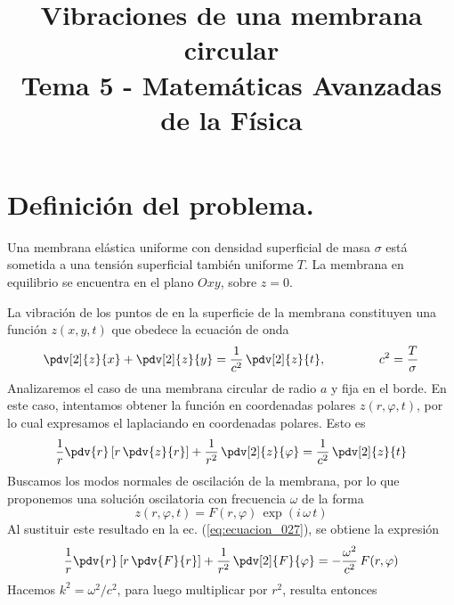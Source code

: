 
\title{Vibraciones de una membrana circular \\ {\large Tema 5 - Matemáticas Avanzadas de la Física}\vspace{-1.5\baselineskip}}
\date{ }
\author{}

\maketitle
\fontsize{14}{14}\selectfont
\section{Definición del problema.}
Una membrana elástica uniforme con densidad superficial de masa $\sigma$ está sometida a
una tensión superficial también uniforme $T$. La membrana en equilibrio se encuentra en
el plano $Oxy$, sobre $z = 0$.
\par
La vibración de los puntos de en la superficie de la membrana constituyen una función $z(x, y, t)$ que obedece la ecuación de onda
\begin{equation}
\pdv[2]{z}{x} + \pdv[2]{z}{y} = \dfrac{1}{c^{2}} \, \pdv[2]{z}{t}, \hspace{1.5cm} c^{2} = \dfrac{T}{\sigma}
\label{eq:ecuacion_026}
\end{equation}
Analizaremos el caso de una membrana circular de radio $a$ y fija en el borde. En este
caso, intentamos obtener la función en coordenadas polares $z (r , \varphi, t)$, por lo cual expresamos el laplaciando en coordenadas polares. Esto es
\begin{equation}
\dfrac{1}{r} \pdv{r} \left[ r \, \pdv{z}{r} \right] + \dfrac{1}{r^{2}} \, \pdv[2]{z}{\varphi} = \dfrac{1}{c^{2}} \, \pdv[2]{z}{t}
\label{eq:ecuacion_027}
\end{equation}
Buscamos los modos normales de oscilación de la membrana, por lo que proponemos
una solución oscilatoria con frecuencia $\omega$ de la forma
\begin{equation}
z(r, \varphi, t) = F (r, \varphi) \, \exp(i \, \omega \, t)
\label{eq:ecuacion_028}
\end{equation}
Al sustituir este resultado en la ec. (\ref{eq:ecuacion_027}), se obtiene la expresión
\begin{equation}
\dfrac{1}{r} \pdv{r} \left[ r \, \pdv{F}{r} \right] + \dfrac{1}{r^{2}} \, \pdv[2]{F}{\varphi} = -\dfrac{\omega^{2}}{c^{2}} \, F(r, \varphi)
\label{eq:ecuacion_029}
\end{equation}
Hacemos $k^{2} = \omega^{2}/c^{2}$, para luego multiplicar por $r^{2}$, resulta entonces

